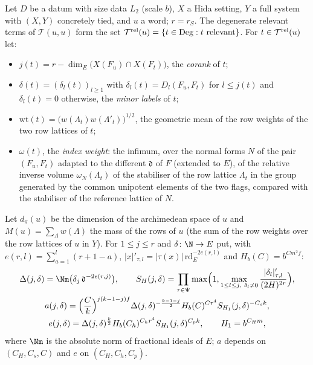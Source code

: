 \begin{definition}\label{pf:sh-flag:deflabels}
Let $D$ be a datum with size data $L_2$ (scale $b$), $X$ a Hida setting, $Y$ a full system with $(X,Y)$ concretely tied, and
$u$ a word; $r=r_S$. The degenerate relevant terms of $\mathcal T(u,u)$ form the set
$\mathcal T^{\mathrm{rel}}(u)=\{t\in\mathrm{Deg}:t\text{ relevant}\}$. For $t\in\mathcal T^{\mathrm{rel}}(u)$ let:
\begin{itemize}
\item $j(t)=r-\dim_E\bigl(X(F_u)\cap X(F_t)\bigr)$, the \emph{corank} of $t$;
\item $\delta(t)=(\delta_l(t))_{l\ge1}$ with $\delta_l(t)=D_l(F_u,F_t)$ for $l\le j(t)$ and $\delta_l(t)=0$ otherwise, the
\emph{minor labels} of $t$;
\item $\mathrm{wt}(t)=\bigl(w(\Lambda_t)w(\Lambda'_t)\bigr)^{1/2}$, the geometric mean of the row weights of the two row lattices of
$t$;
\item $\omega(t)$, the \emph{index weight}: the infimum, over the normal forms $N$ of the pair $(F_u,F_t)$ adapted to the
different $\mathfrak d$ of $F$ (extended to $E$), of the relative inverse volume $\omega_N(\Lambda_t)$ of the stabiliser of the
row lattice $\Lambda_t$ in the group generated by the common unipotent elements of the two flags, compared with the stabiliser
of the reference lattice of $N$.
\end{itemize}
Let $d_\pi(u)$ be the dimension of the archimedean space of $u$ and $M(u)=\sum_\Lambda w(\Lambda)$ the mass of the rows of $u$
(the sum of the row weights over the row lattices of $u$ in $Y$). For $1\le j\le r$ and $\delta\colon\N\to E$ put, with
$e(r,l)=\sum_{a=1}^l(r+1-a)$, $|x|'_{\tau,l}=|\tau(x)|\,\mathrm{rd}_E^{-2e(r,l)}$ and $H_b(C)=b^{Cm^2f}$:
\begin{gather*}
\Delta(j,\delta)=\Nm\bigl(\delta_j\,\mathfrak d^{-2e(r,j)}\bigr),\qquad
S_H(j,\delta)=\prod_{\tau\in\Psi}\max\Bigl(1,\max_{1\le l\le j,\ \delta_l\ne0}\frac{|\delta_l|'_{\tau,l}}{(2H)^{2r}}\Bigr),\\
a(j,\delta)=\Bigl(\frac Ck\Bigr)^{j(k-1-j)f}\Delta(j,\delta)^{-\frac{k-1-j}2}H_b(C)^{Cr^4}S_{H_1}(j,\delta)^{-C_sk},\\
e(j,\delta)=\Delta(j,\delta)^{\frac k2}H_b(C_h)^{C_hr^4}S_{H_1}(j,\delta)^{C_pk},\qquad H_1=b^{C_Hm},
\end{gather*}
where $\Nm$ is the absolute norm of fractional ideals of $E$; $a$ depends on $(C_H,C_s,C)$ and $e$ on $(C_H,C_h,C_p)$.
\ \ \
\ 
\end{definition}

